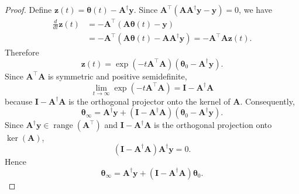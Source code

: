 \documentclass[10pt,a4paper]{amsart}
\newcommand{\bA}{\boldsymbol{A}}
\newcommand{\bI}{\boldsymbol{I}}
\newcommand{\btheta}{{\boldsymbol{\theta}}}
\newcommand{\by}{\boldsymbol{y}}
\newcommand{\bz}{\boldsymbol{z}}
\begin{document}
\begin{proof}
Define $\bz(t)=\btheta(t)-\bA^\dagger\by$. Since $\bA^\top(\bA\bA^\dagger\by-\by)=0$, we have
\begin{align*}
    \frac{d}{dt}{\bz}(t)
    &=-\bA^\top(\bA\btheta(t)-\by)\\
    &=-\bA^\top(\bA\btheta(t)-\bA\bA^\dagger\by)
    =-\bA^\top\bA\bz(t).
\end{align*}
Therefore
\begin{equation*}
    \bz(t)=\exp(-t\bA^\top\bA)(\btheta_0-\bA^\dagger\by).
\end{equation*}
Since $\bA^\top\bA$ is symmetric and positive semidefinite,
\begin{equation*}
    \lim_{t\to\infty}\exp(-t\bA^\top\bA)=\bI-\bA^\dagger\bA
\end{equation*}
because $\bI-\bA^\dagger\bA$ is the orthogonal projector onto the kernel of $\bA$. Consequently,
\begin{equation*}
    \btheta_\infty=\bA^\dagger\by+(\bI-\bA^\dagger\bA)(\btheta_0-\bA^\dagger\by).
\end{equation*}
Since $\bA^\dagger\by\in\operatorname{range}(\bA^\top)$ and $\bI-\bA^\dagger\bA$ is the orthogonal projection onto $\ker(\bA)$,
\begin{equation*}
    (\bI-\bA^\dagger\bA)\bA^\dagger\by=0.
\end{equation*}
Hence
\begin{equation*}
    \btheta_\infty=\bA^\dagger\by+(\bI-\bA^\dagger\bA)\btheta_0. \tag*{\qed}
\end{equation*}
\end{proof}
\end{document}
